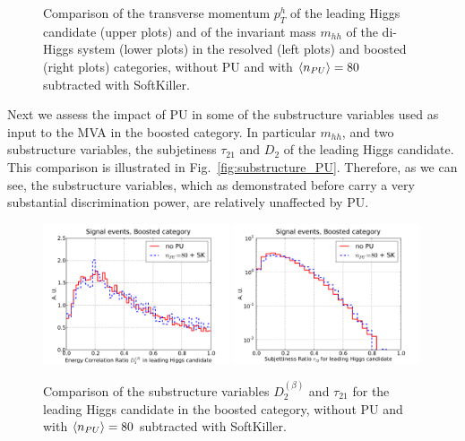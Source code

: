 \begin{figure}[t]
\begin{center}
  \caption{\small
    Comparison of the transverse momentum $p_T^h$ of the leading
    Higgs candidate (upper plots) and of the invariant mass $m_{hh}$
    of the di-Higgs system (lower plots) in the resolved
    (left plots) and boosted (right plots) categories,
    without PU and with $\left\langle n_{PU}\right\rangle=80$ subtracted with SoftKiller.
}
\label{fig:mHH_PU}
\end{center}
\end{figure}

Next we assess the impact of PU in some of the substructure variables
used as input to the MVA in the boosted category.
%
In particular $m_{hh}$, and two substructure variables, the subjetiness
$\tau_{21}$ and $D_2$ of the leading Higgs candidate.
%
This comparison is illustrated in Fig.~\ref{fig:substructure_PU}.
%
Therefore, as we can see, the substructure variables, which
as demonstrated before carry a very substantial
discrimination power, are relatively unaffected by PU.


\begin{figure}[t]
  \begin{center}
    \vspace{-1cm}
  \includegraphics[width=0.49\textwidth]{plots/D2_h0_bst_comp.pdf}
  \includegraphics[width=0.49\textwidth]{plots/tau21_h0_bst_comp.pdf}
   \caption{\small
     Comparison of the substructure variables $D_2^{(\beta)}$
     and $\tau_{21}$ for the leading Higgs candidate in the boosted category,
   without PU and with $\left\langle n_{PU}\right\rangle=80$ subtracted with SoftKiller.
}
\label{fig:Substructure_PU}
\end{center}
\end{figure}


